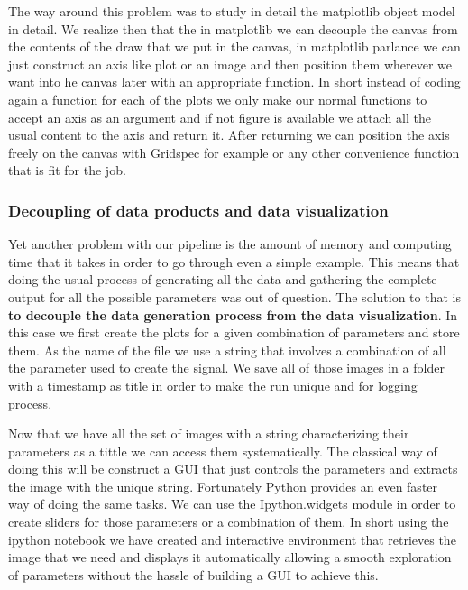 \documentclass[11pt,a4paper]{article}
\begin{document}
The way around this problem was to study in detail the matplotlib object
model in detail. We realize then that the in matplotlib we can decouple
the canvas from the contents of the draw that we put in the canvas, in
matplotlib parlance we can just construct an axis like plot or an image
and then position them wherever we want into he canvas later with an
appropriate function. In short instead of coding again a function for
each of the plots we only make our normal functions to accept an axis as
an argument and if not figure is available we attach all the usual
content to the axis and return it. After returning we can position the
axis freely on the canvas with Gridspec for example or any other
convenience function that is fit for the job.

\subsubsection{Decoupling of data products and data
visualization}\label{decoupling-of-data-products-and-data-visualization}

Yet another problem with our pipeline is the amount of memory and
computing time that it takes in order to go through even a simple
example. This means that doing the usual process of generating all the
data and gathering the complete output for all the possible parameters
was out of question. The solution to that is \textbf{to decouple the
data generation process from the data visualization}. In this case we
first create the plots for a given combination of parameters and store
them. As the name of the file we use a string that involves a
combination of all the parameter used to create the signal. We save all
of those images in a folder with a timestamp as title in order to make
the run unique and for logging process.

Now that we have all the set of images with a string characterizing
their parameters as a tittle we can access them systematically. The
classical way of doing this will be construct a GUI that just controls
the parameters and extracts the image with the unique string.
Fortunately Python provides an even faster way of doing the same tasks.
We can use the Ipython.widgets module in order to create sliders for
those parameters or a combination of them. In short using the ipython
notebook we have created and interactive environment that retrieves the
image that we need and displays it automatically allowing a smooth
exploration of parameters without the hassle of building a GUI to
achieve this.
\end{document}
